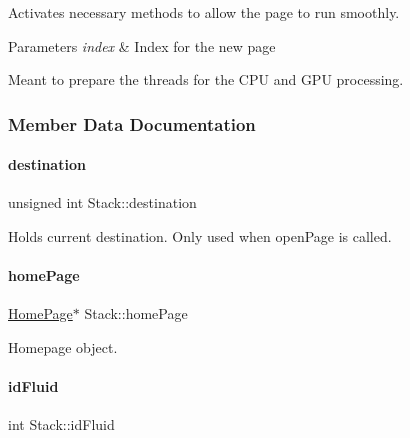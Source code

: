 Activates necessary methods to allow the page to run smoothly. 
\begin{DoxyParams}{Parameters}
{\em index} & Index for the new page\\
\hline
\end{DoxyParams}
Meant to prepare the threads for the C\+PU and G\+PU processing. 

\subsubsection{Member Data Documentation}
\mbox{\label{classStack_a1ef23f9e493b0f9d535eb8282114444d}} 
\paragraph{\texorpdfstring{destination}{destination}}
{\footnotesize\ttfamily unsigned int Stack\+::destination\hspace{0.3cm}{\ttfamily [private]}}



Holds current destination. Only used when open\+Page is called. 

\mbox{\label{classStack_aa1bb5aa087f1766cec2dab2174159194}} 
\paragraph{\texorpdfstring{homePage}{homePage}}
{\footnotesize\ttfamily \mbox{\hyperlink{classHomePage}{Home\+Page}}$\ast$ Stack\+::home\+Page\hspace{0.3cm}{\ttfamily [private]}}



Homepage object. 

\mbox{\label{classStack_a91b33262d86feccc9a358076b69a0e90}} 
\paragraph{\texorpdfstring{idFluid}{idFluid}}
{\footnotesize\ttfamily int Stack\+::id\+Fluid\hspace{0.3cm}{\ttfamily [private]}}



